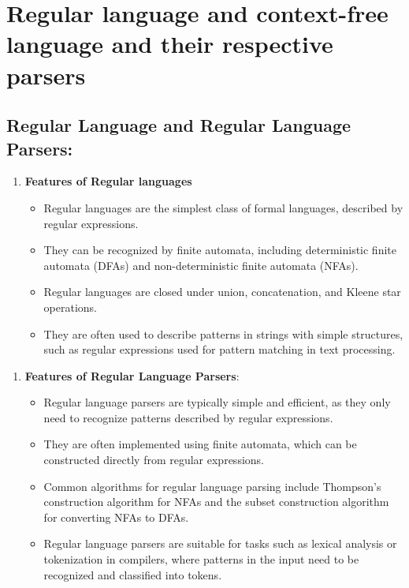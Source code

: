 \documentclass{article}
\begin{document}
\section{Regular language and context-free language and their respective parsers}
\subsection{
Regular Language and Regular Language Parsers:}
\begin{enumerate}
\item \textbf{Features of Regular languages}
\begin{itemize}
\item Regular languages are the simplest class of formal languages, described by regular expressions.
            \item They can be recognized by finite automata, including deterministic finite automata (DFAs) and non-deterministic finite automata (NFAs).
            \item Regular languages are closed under union, concatenation, and Kleene star operations.
            \item They are often used to describe patterns in strings with simple structures, such as regular expressions used for pattern matching in text processing.



\end{itemize}

\end{enumerate}
\begin{enumerate}
\item \textbf{Features of Regular Language Parsers}:
        \begin{itemize}
            \item Regular language parsers are typically simple and efficient, as they only need to recognize patterns described by regular expressions.
            \item They are often implemented using finite automata, which can be constructed directly from regular expressions.
            \item Common algorithms for regular language parsing include Thompson's construction algorithm for NFAs and the subset construction algorithm for converting NFAs to DFAs.
            \item Regular language parsers are suitable for tasks such as lexical analysis or tokenization in compilers, where patterns in the input need to be recognized and classified into tokens.
        \end{itemize}
\end{enumerate}
\end{document}
